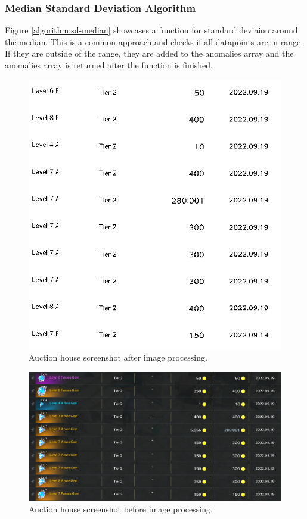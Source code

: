 \documentclass[journal]{IEEEtran}
\begin{document}
\subsubsection{Median Standard Deviation Algorithm}
Figure \ref{algorithm:sd-median} showcases a function for standard deviaion around the median. This is a common approach and checks if all datapoints are in range. If they are outside of the range, they are added to the anomalies array and the anomalies array is returned after the function is finished.

\begin{figure}[!b]
    \centering
    \includegraphics[scale=0.25]{auction-house-after}
    \caption{Auction house screenshot after image processing.}
    \label{figure:auction-house-after}
\end{figure}

\begin{figure}[!t]
    \centering
    \includegraphics[width=12cm]{auction-house-before.png}
    \caption{Auction house screenshot before image processing.}
    \label{figure:auction-house-before}
\end{figure}
\end{document}
